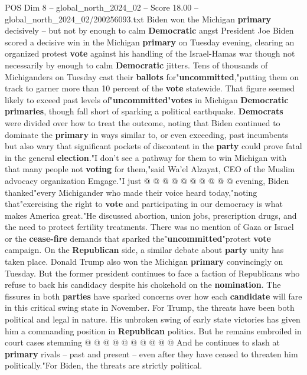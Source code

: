 \begin{textsample}{POS Dim 8 – global\_north\_2024\_02 – Score 18.00 – global\_north\_2024\_02/200256093.txt}  \label{ex:f8_pos_021}
Biden won the Michigan \textbf{primary} decisively -- but not by enough to calm \textbf{Democratic} angst President Joe Biden scored a decisive win in the Michigan \textbf{primary} on Tuesday evening, clearing an organized protest \textbf{vote} against his handling of the Israel-Hamas war though not necessarily by enough to calm \textbf{Democratic} jitters.
Tens of thousands of Michiganders on Tuesday cast their \textbf{ballots} for"\textbf{uncommitted},"putting them on track to garner more than 10 percent of the \textbf{vote} statewide.
That figure seemed likely to exceed past levels of"\textbf{uncommitted}"\textbf{votes} in Michigan \textbf{Democratic} \textbf{primaries}, though fall short of sparking a political earthquake. \textbf{Democrats} were divided over how to treat the outcome, noting that Biden continued to dominate the \textbf{primary} in ways similar to, or even exceeding, past incumbents but also wary that significant pockets of discontent in the \textbf{party} could prove fatal in the general \textbf{election}."I don't see a pathway for them to win Michigan with that many people not \textbf{voting} for them,"said Wa'el Alzayat, CEO of the Muslim advocacy organization Emgage."I just @ @ @ @ @ @ @ @ @ @ evening, Biden thanked"every Michigander who made their voice heard today,"noting that"exercising the right to \textbf{vote} and participating in our democracy is what makes America great."He discussed abortion, union jobs, prescription drugs, and the need to protect fertility treatments.
There was no mention of Gaza or Israel or the \textbf{cease-fire} demands that sparked the"\textbf{uncommitted}"protest \textbf{vote} campaign.
On the \textbf{Republican} side, a similar debate about \textbf{party} unity has taken place.
Donald Trump also won the Michigan \textbf{primary} convincingly on Tuesday.
But the former president continues to face a faction of Republicans who refuse to back his candidacy despite his chokehold on the \textbf{nomination}.
The fissures in both \textbf{parties} have sparked concerns over how each \textbf{candidate} will fare in this critical swing state in November.
For Trump, the threats have been both political and legal in nature.
His unbroken swing of early state victories has given him a commanding position in \textbf{Republican} politics.
But he remains embroiled in court cases stemming @ @ @ @ @ @ @ @ @ @ And he continues to slash at \textbf{primary} rivals -- past and present -- even after they have ceased to threaten him politically."For Biden, the threats are strictly political.

\end{textsample}
